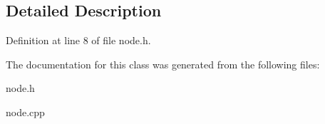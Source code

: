 \subsection{Detailed Description}


Definition at line 8 of file node.\+h.



The documentation for this class was generated from the following files\+:\begin{DoxyCompactItemize}
\item 
node.\+h\item 
node.\+cpp\end{DoxyCompactItemize}
